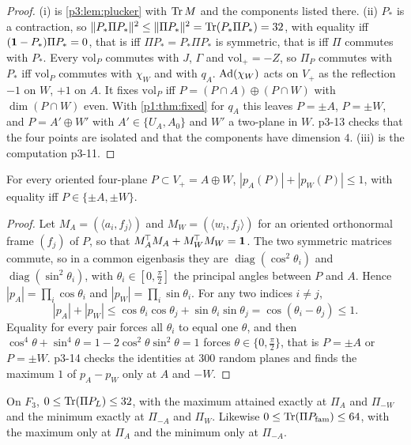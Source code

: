 \begin{proof}
(i) is \cref{p3:lem:plucker} with $\operatorname{Tr} M$ and the components listed there. (ii) $P_*$ is a contraction, so $\|P_*\Pi P_*\|^2\le\|\Pi P_*\|^2=\operatorname{Tr}(P_*\Pi P_*)=32$, with equality
iff $(\mathbf 1-P_*)\Pi P_*=0$, that is iff $\Pi P_*=P_*\Pi P_*$ is symmetric, that is iff $\Pi$ commutes with $P_*$. Every $\mathrm{vol}_P$ commutes with $J$, $\Gamma$ and
$\mathrm{vol}_+=-Z$, so $\Pi_P$ commutes with $P_*$ iff $\mathrm{vol}_P$ commutes with $\chi_W$ and with $q_A$. $\operatorname{Ad}(\chi_W)$ acts on $V_+$ as the reflection $-1$ on $W$, $+1$ on $A$.
It fixes $\mathrm{vol}_P$ iff $P=(P\cap A)\oplus(P\cap W)$ with $\dim(P\cap W)$ even. With \cref{p1:thm:fixed} for $q_A$ this leaves $P=\pm A$, $P=\pm W$, and $P=A'\oplus W'$ with
$A'\in\{U_A,A_0\}$ and $W'$ a two-plane in $W$. p3-13 checks that the four points are isolated and that the components have dimension $4$. (iii) is the computation
p3-11.
\end{proof}

\begin{lemma}
\label{p3:lem:comass}
For every oriented four-plane $P\subset V_+=A\oplus W$, $|p_A(P)|+|p_W(P)|\le1$, with equality iff $P\in\{\pm A,\pm W\}$.
\end{lemma}

\begin{proof}
Let $M_A=(\langle a_i,f_j\rangle)$ and $M_W=(\langle w_i,f_j\rangle)$ for an oriented orthonormal frame $(f_j)$ of $P$, so that $M_A^{\!\top}M_A+M_W^{\!\top}M_W=\mathbf 1$. The two
symmetric matrices commute, so in a common eigenbasis they are $\operatorname{diag}(\cos^2\theta_i)$ and $\operatorname{diag}(\sin^2\theta_i)$, with
$\theta_i\in[0,\tfrac\pi2]$ the principal angles between $P$ and $A$. Hence $|p_A|=\prod_i\cos\theta_i$ and $|p_W|=\prod_i\sin\theta_i$. For any two indices $i\neq j$,
\[
|p_A|+|p_W|\le\cos\theta_i\cos\theta_j+\sin\theta_i\sin\theta_j=\cos(\theta_i-\theta_j)\le1 .
\]
Equality for every pair forces all $\theta_i$ to equal one $\theta$, and then $\cos^4\theta+\sin^4\theta=1-2\cos^2\theta\sin^2\theta=1$ forces $\theta\in\{0,\tfrac\pi2\}$,
that is $P=\pm A$ or $P=\pm W$. p3-14 checks the identities at $300$ random planes and finds the maximum $1$ of $p_A-p_W$ only at $A$ and $-W$.
\end{proof}

\begin{corollary}
\label{p3:cor:extremes}
On $F_3$, $0\le\operatorname{Tr}(\Pi P_L)\le32$, with the maximum attained exactly at $\Pi_A$ and $\Pi_{-W}$ and the minimum exactly at $\Pi_{-A}$ and $\Pi_W$. Likewise
$0\le\operatorname{Tr}(\Pi P_{\rm fam})\le64$, with the maximum only at $\Pi_A$ and the minimum only at $\Pi_{-A}$.
\end{corollary}

